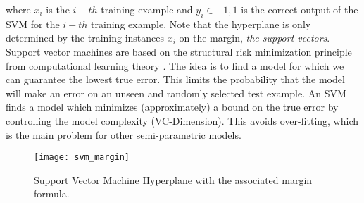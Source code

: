 where $x_i$ is the $i-th$ training example and $y_i \in {-1, 1}$
is the correct output of the SVM for the $i-th$ training
example. Note that the hyperplane is only determined
by the training instances $x_i$ on the margin, \textit{the support vectors}.
Support vector machines are based on the structural
risk minimization principle from computational
learning theory \cite{vapnik1999overview}. The idea is to find a model for which
we can guarantee the lowest true error. This limits
the probability that the model will make an error on
an unseen and randomly selected test example. An
SVM finds a model which minimizes (approximately)
a bound on the true error by controlling the model
complexity (VC-Dimension). This avoids over-fitting,
which is the main problem for other semi-parametric
models.
\begin{figure}[ht]
	\centering
	\texttt{[image: svm\_margin]}
	\caption[Support Vector Machine Hyperplane margin]{Support Vector Machine Hyperplane with the associated margin formula.}
	\label{fig:svm_margin}
\end{figure}

